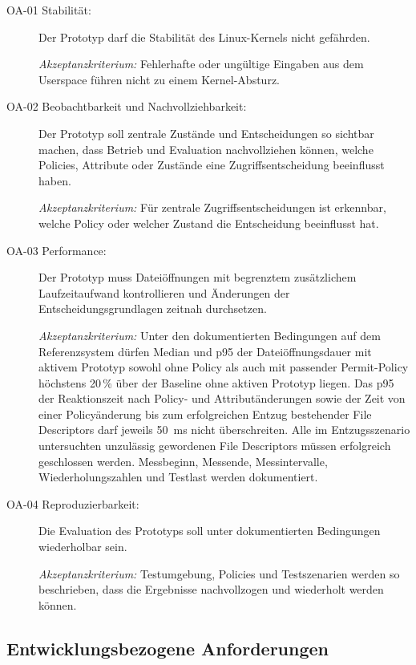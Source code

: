 \begin{description}
    \item[OA-01 Stabilität:]
    Der Prototyp darf die Stabilität des Linux-Kernels nicht gefährden.
    
    \textit{Akzeptanzkriterium:} Fehlerhafte oder ungültige Eingaben aus dem Userspace führen nicht zu einem Kernel-Absturz.

    \item[OA-02 Beobachtbarkeit und Nachvollziehbarkeit:]
    Der Prototyp soll zentrale Zustände und Entscheidungen so sichtbar machen, dass Betrieb und Evaluation nachvollziehen können, welche Policies, Attribute oder Zustände eine Zugriffsentscheidung beeinflusst haben.
    
    \textit{Akzeptanzkriterium:} Für zentrale Zugriffsentscheidungen ist erkennbar, welche Policy oder welcher Zustand die Entscheidung beeinflusst hat.

    \item[OA-03 Performance:]
    Der Prototyp muss Dateiöffnungen mit begrenztem zusätzlichem Laufzeitaufwand kontrollieren und Änderungen der Entscheidungsgrundlagen zeitnah durchsetzen.
    
    \textit{Akzeptanzkriterium:} Unter den dokumentierten Bedingungen auf dem Referenzsystem dürfen Median und p95 der Dateiöffnungsdauer mit aktivem Prototyp sowohl ohne Policy als auch mit passender Permit-Policy höchstens 20\,\% über der Baseline ohne aktiven Prototyp liegen. Das p95 der Reaktionszeit nach Policy- und Attributänderungen sowie der Zeit von einer Policyänderung bis zum erfolgreichen Entzug bestehender File Descriptors darf jeweils 50~ms nicht überschreiten. Alle im Entzugsszenario untersuchten unzulässig gewordenen File Descriptors müssen erfolgreich geschlossen werden. Messbeginn, Messende, Messintervalle, Wiederholungszahlen und Testlast werden dokumentiert.

    \item[OA-04 Reproduzierbarkeit:]
    Die Evaluation des Prototyps soll unter dokumentierten Bedingungen wiederholbar sein.
    
    \textit{Akzeptanzkriterium:} Testumgebung, Policies und Testszenarien werden so beschrieben, dass die Ergebnisse nachvollzogen und wiederholt werden können.
\end{description}

\subsection{Entwicklungsbezogene Anforderungen}

